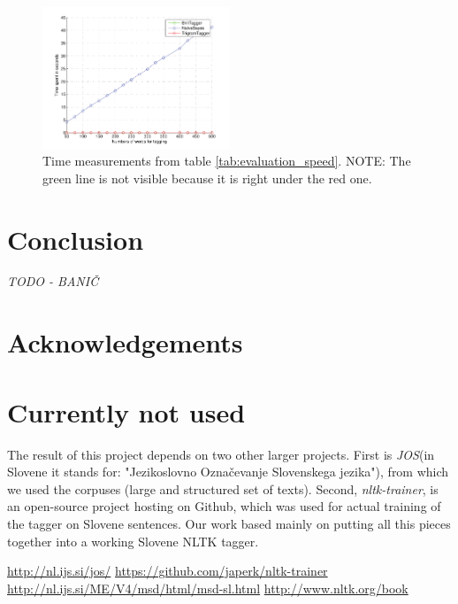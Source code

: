 \documentclass[10pt, conference, compsocconf]{IEEEtran}
\begin{document}
\begin{figure}[htb]
\begin{center}
\includegraphics[width=0.5\textwidth]{../evaluation/graph_speed.pdf} 
\end{center}
\caption{Time measurements from table \ref{tab:evaluation_speed}. NOTE: The green line is not visible because it is right under the red one.}
\label{fig:evaluation}
\end{figure}


\section{Conclusion} %
\textit{TODO - BANIČ}

\section*{Acknowledgements}

\section{Currently not used}
The result of this project depends on two other larger projects. First is \textit{JOS}\cite{JOS}(in Slovene it stands for: "Jezikoslovno Označevanje Slovenskega jezika"), from which we used the corpuses (large and structured set of texts). Second, \textit{nltk-trainer}\cite{nltk-trainer}, is an open-source project hosting on Github, which was used for actual training of the tagger on Slovene sentences. Our work based mainly on putting all this pieces together into a working Slovene NLTK tagger.

\begin{thebibliography}{99}
 \url{http://nl.ijs.si/jos/}
 \url{https://github.com/japerk/nltk-trainer}
 \url{http://nl.ijs.si/ME/V4/msd/html/msd-sl.html}
 \url{http://www.nltk.org/book}
\end{thebibliography}
\end{document}

